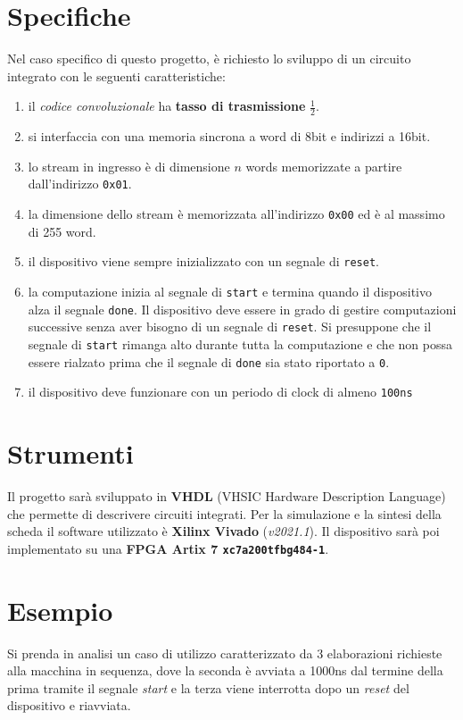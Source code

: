 \documentclass[a4paper]{report}
\begin{document}
\section{Specifiche}
Nel caso specifico di questo progetto, è richiesto lo sviluppo di un circuito integrato con le seguenti caratteristiche: 
\begin{enumerate}
\item il \textit{codice convoluzionale} ha \textbf{tasso di trasmissione} $\frac{1} {2}$.
\item si interfaccia con una memoria sincrona a word di 8bit e indirizzi a 16bit.
\item lo stream in ingresso è di dimensione $n$ words memorizzate a partire dall'indirizzo \texttt{0x01}.
\item la dimensione dello stream è memorizzata all'indirizzo \texttt{0x00} ed è al massimo di 255 word.
\item il dispositivo viene sempre inizializzato con un segnale di \texttt{reset}.
\item la computazione inizia al segnale di \texttt{start} e termina quando il dispositivo alza il segnale \texttt{done}. Il dispositivo deve essere in grado di gestire computazioni successive senza aver bisogno di un segnale di \texttt{reset}. Si presuppone che il segnale di \texttt{start} rimanga alto durante tutta la computazione e che non possa essere rialzato prima che il segnale di \texttt{done} sia stato riportato a \texttt{0}.
\item il dispositivo deve funzionare con un periodo di clock di almeno \texttt{100ns}
\end{enumerate}

\section{Strumenti}
Il progetto sarà sviluppato in \textbf{VHDL} (VHSIC Hardware Description Language) che permette di descrivere circuiti integrati.
Per la simulazione e la sintesi della scheda il software utilizzato è \textbf{Xilinx Vivado} (\textit{v2021.1}).
Il dispositivo sarà poi implementato su una \textbf{FPGA Artix 7 \texttt{xc7a200tfbg484-1}}.

\section{Esempio}
Si prenda in analisi un caso di utilizzo caratterizzato da 3 elaborazioni richieste alla macchina in sequenza, dove la seconda è avviata a 1000ns dal termine della prima tramite il segnale \textit{start} e la terza viene interrotta dopo un \textit{reset} del dispositivo e riavviata.
\end{document}
